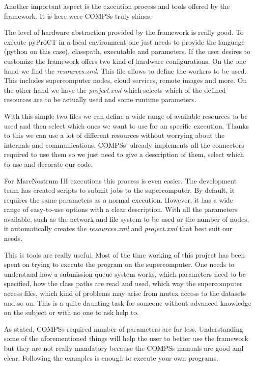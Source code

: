 Another important aspect is the execution process and tools offered by the framework. It is here were COMPSs truly shines. 

The level of hardware abstraction provided by the framework is really good. To execute pyProCT in a local environment one just needs to provide the language (python on this case), classpath, executable and parameters. If the user desires to customize the framework offers two kind of hardware configurations. On the one hand we find the \textit{resources.xml}. This file allows to define the workers to be used. This includes supercomputer nodes, cloud services, remote images and more. On the other hand we have the \textit{project.xml} which selects which of the defined resources are to be actually used and some runtime parameters. 

With this simple two files we can define a wide range of available resources to be used and then select which ones we want to use for an specific execution. Thanks to this we can use a lot of different resources without worrying about the internals and communications. COMPSs' already implements all the connectors required to use them so we just need to give a description of them, select which to use and decorate our code. 

For MareNostrum III executions this process is even easier. The development team has created scripts to submit jobs to the supercomputer. By default, it requires the same parameters as a normal execution. However, it has a wide range of easy-to-use options with a clear description. With all the parameters available, such as the network and file system to be used or the number of nodes, it automatically creates the \textit{resources.xml} and \textit{project.xml} that best suit our needs. 

This is tools are really useful. Most of the time working of this project has been spent on trying to execute the program on the supercomputer. One needs to understand how a submission queue system works, which parameters need to be specified, how the class paths are read and used, which way the supercomputer access files, which kind of problems may arise from mutex access to the datasets and so on. This is a quite daunting task for someone without advanced knowledge on the subject or with no one to ask help to. 

As stated, COMPSs required number of parameters are far less. Understanding some of the aforementioned things will help the user to better use the framework but they are not really mandatory because the COMPSs manuals are good and clear. Following the examples is enough to execute your own programs. 




